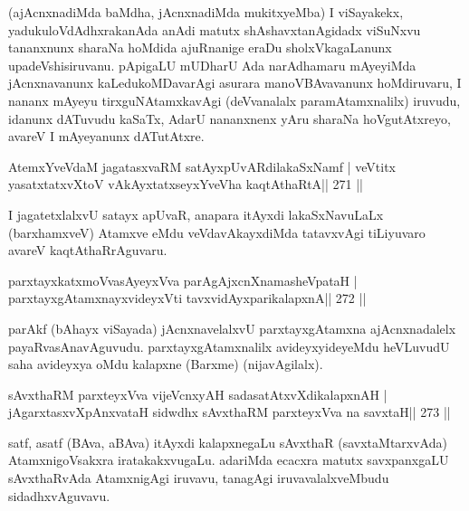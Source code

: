 \begin{artha}
(ajAcnxnadiMda baMdha, jAcnxnadiMda mukitxyeMba) I viSayakekx, yadu\-kuloVdAdhxrakanAda anAdi matutx shAshavxtanAgidadx viSuNxvu tananxnunx sharaNa hoMdida ajuRnanige eraDu sholxVkagaLanunx upadeVshisiruvanu. pApigaLU mUDharU Ada narAdhamaru mAyeyiMda jAcnxnavanunx kaLedukoMDavarAgi asurara manoVBAvavanunx hoMdiruvaru, I nananx mAyeyu tirxguNAtamxkavAgi (deVvanalalx paramAtamxnalilx) iruvudu, idanunx dATuvudu kaSaTx, AdarU nananxnenx yAru sharaNa hoVgutAtxreyo, avareV I mAyeyanunx dATutAtxre.
\end{artha}
 

\begin{shl}
AtemxYveVdaM jagatasxvaRM satAyxpUvARdilakaSxNamf |
veVtitx yasatxtatxvXtoV vAkAyxtatxseyxYveVha kaqtAthaRtA\hfill || 271 ||
\end{shl}

\begin{artha}
I jagatetxlalxvU satayx apUvaR, anapara itAyxdi lakaSxNavuLaLx  (barxhamxveV) Atamxve eMdu veVdavAkayxdiMda tatavxvAgi tiLiyuvaro avareV kaqtAthaRrAguvaru.
\end{artha}

\begin{shl}
parxtayxkatxmoVvasAyeyxVva parAgAjxcnXnamasheVpataH |
parxtayxgAtamxnayxvideyxVti tavxvidAyxparikalapxnA\hfill || 272 ||
\end{shl}

\begin{artha}
parAkf (bAhayx viSayada) jAcnxnavelalxvU parxtayxgAtamxna  ajAcnxnadalelx payaRvasAna\-vAguvudu. parxtayxgAtamxnalilx avideyxyideyeMdu heVLuvudU saha avideyxya oMdu kalapxne (Barxme) (nijavAgilalx).
\end{artha}

\begin{shl}
sAvxthaRM parxteyxVva vijeVcnxyAH sadasatAtxvXdikalapxnAH |
jAgarxtasxvXpAnxvataH sidwdhx sAvxthaRM parxteyxVva na savxtaH\hfill || 273 ||
\end{shl}

\begin{artha}
satf, asatf (BAva, aBAva) itAyxdi kalapxnegaLu sAvxthaR  (savxtaMtarxvAda) AtamxnigoVsakxra iratakakxvugaLu. adariMda ecacxra  matutx savxpanxgaLU sAvxthaRvAda AtamxnigAgi iruvavu, tanagAgi iruvavalalxveMbudu sidadhxvAguvavu.
\end{artha}



